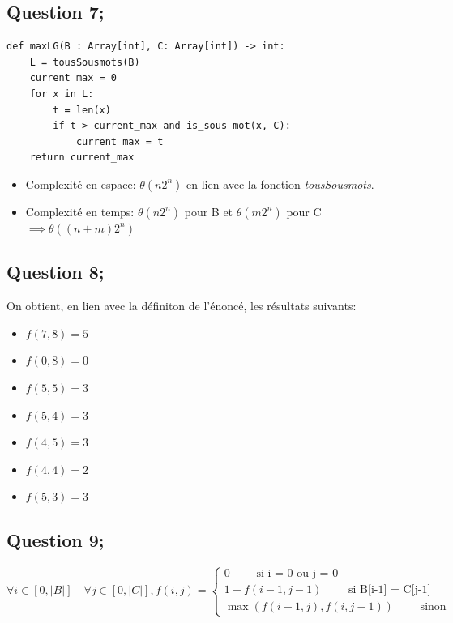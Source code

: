 \documentclass{article}
\begin{document}
\subsection*{Question 7;}

\begin{lstlisting}[label=python, caption={\textit{maxLG}}]
def maxLG(B : Array[int], C: Array[int]) -> int:
    L = tousSousmots(B)
    current_max = 0
    for x in L:
        t = len(x)
        if t > current_max and is_sous-mot(x, C):
            current_max = t
    return current_max
\end{lstlisting}

\begin{itemize}
    \item Complexité en espace: $ \theta(n2^n) $ en lien avec la fonction \textit{tousSousmots}.
    \item Complexité en temps: $ \theta(n2^n) $ pour B et $\theta(m2^n) $ pour C $ \implies \theta((n+m)2^n) $
\end{itemize}

\subsection*{Question 8;}

On obtient, en lien avec la définiton de l'énoncé, les résultats suivants:
\begin{itemize}
    \item $ f(7,8) = 5 $
    \item $ f(0,8) = 0 $ 
    \item $ f(5,5) = 3 $ 
    \item $ f(5,4) = 3 $ 
    \item $ f(4,5) = 3 $
    \item $ f(4,4) = 2 $
    \item $ f(5,3) = 3 $
\end{itemize}

\subsection*{Question 9;}

\[
\forall i \in [0,|B|] \quad \forall j \in [0,|C|], f(i,j) = 
\begin{cases}
    0 \qquad \text{ si i = 0 ou j = 0}
    \\
    1 + f(i-1,j-1) \qquad \text{ si B[i-1] = C[j-1]}
    \\
    \max(f(i-1,j), f(i,j-1)) \qquad \text{ sinon}
\end{cases}
\]
\end{document}
